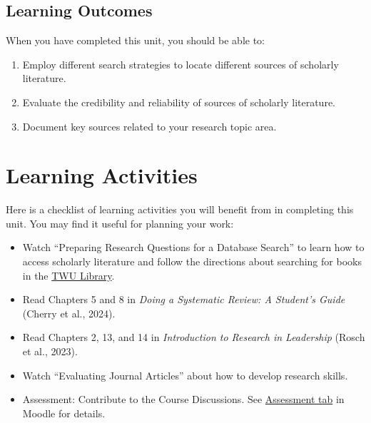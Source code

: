 \documentclass[
  letterpaper,
  DIV=11,
  numbers=noendperiod]{scrreprt}
\providecommand{\tightlist}{%
  \setlength{\itemsep}{0pt}\setlength{\parskip}{0pt}}\usepackage{longtable,booktabs,array}
\begin{document}
\subsection*{Learning Outcomes}\label{learning-outcomes-1}

When you have completed this unit, you should be able to:

\begin{enumerate}
\def\labelenumi{\arabic{enumi}.}
\tightlist
\item
  Employ different search strategies to locate different sources of
  scholarly literature.
\item
  Evaluate the credibility and reliability of sources of scholarly
  literature.
\item
  Document key sources related to your research topic area.
\end{enumerate}

\section*{Learning Activities}\label{learning-activities-3}


Here is a checklist of learning activities you will benefit from in
completing this unit. You may find it useful for planning your work:

\begin{itemize}
\tightlist
\item
  Watch ``Preparing Research Questions for a Database Search'' to learn
  how to access scholarly literature and follow the directions about
  searching for books in the
  \href{https://www.twu.ca/academics/library}{TWU Library}.
\item
  Read Chapters 5 and 8 in \emph{Doing a Systematic Review: A Student's
  Guide} (Cherry et al., 2024).
\item
  Read Chapters 2, 13, and 14 in \emph{Introduction to Research in
  Leadership} (Rosch et al., 2023).
\item
  Watch ``Evaluating Journal Articles'' about how to develop research
  skills.
\item
  Assessment: Contribute to the Course Discussions. See
  \href{https://learn.twu.ca/course/view.php?id=33799&section=8\#tabs-tree-start}{Assessment
  tab} in Moodle for details.
\end{itemize}
\end{document}
